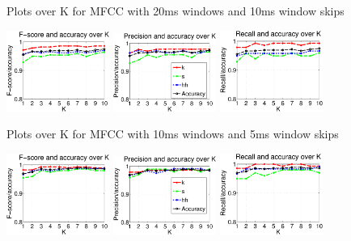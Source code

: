 {\begin{figure}
			\caption{Plots over K for MFCC with 20ms windows and 10ms window skips}
		\end{figure}
		\begin{figure}
			\centering\includegraphics[width=0.3\textwidth]{tex/appendices/test/mfcc105FP.png}
			\centering\includegraphics[width=0.3\textwidth]{tex/appendices/test/mfcc105_P.png}
			\centering\includegraphics[width=0.3\textwidth]{tex/appendices/test/mfcc105_R.png}
			
			\caption{Plots over K for MFCC with 10ms windows and 5ms window skips}
		\end{figure}
		\begin{figure}
			\centering\includegraphics[width=0.3\textwidth]{tex/appendices/test/mfcc52FP.png}
			\centering\includegraphics[width=0.3\textwidth]{tex/appendices/test/mfcc52_P.png}
			\centering\includegraphics[width=0.3\textwidth]{tex/appendices/test/mfcc52_R.png}
			

\end{figure}}
